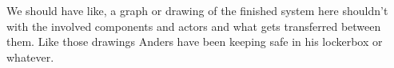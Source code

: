 We should have like, a graph or drawing of the finished system here shouldn't with the involved components and actors and what gets transferred between them.
Like those drawings Anders have been keeping safe in his lockerbox or whatever.
